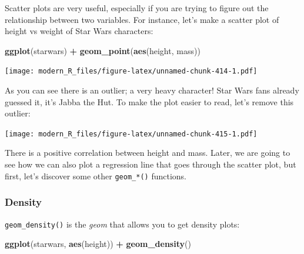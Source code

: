 \documentclass[]{gitbook}
\newenvironment{Shaded}{\begin{snugshade}}{\end{snugshade}}
\newcommand{\KeywordTok}[1]{\textcolor[rgb]{0.13,0.29,0.53}{\textbf{#1}}}
\newcommand{\NormalTok}[1]{#1}
\newcommand{\OperatorTok}[1]{\textcolor[rgb]{0.81,0.36,0.00}{\textbf{#1}}}
\newcommand{\StringTok}[1]{\textcolor[rgb]{0.31,0.60,0.02}{#1}}
\begin{document}
Scatter plots are very useful, especially if you are trying to figure out the relationship between two variables.
For instance, let's make a scatter plot of height vs weight of Star Wars characters:

\begin{Shaded}
\begin{Highlighting}[]
\KeywordTok{ggplot}\NormalTok{(starwars) }\OperatorTok{+}
\StringTok{  }\KeywordTok{geom_point}\NormalTok{(}\KeywordTok{aes}\NormalTok{(height, mass))}
\end{Highlighting}
\end{Shaded}

\texttt{[image: modern\_R\_files/figure-latex/unnamed-chunk-414-1.pdf]}

As you can see there is an outlier; a very heavy character! Star Wars fans already guessed it, it's Jabba the Hut.
To make the plot easier to read, let's remove this outlier:

\begin{Shaded}
\end{Shaded}

\texttt{[image: modern\_R\_files/figure-latex/unnamed-chunk-415-1.pdf]}

There is a positive correlation between height and mass. Later, we are going to see how we can also plot a regression
line that goes through the scatter plot, but first, let's discover some other \texttt{geom\_*()} functions.

\hypertarget{density}{%
\subsubsection{Density}\label{density}}

\texttt{geom\_density()} is the \emph{geom} that allows you to get density plots:

\begin{Shaded}
\begin{Highlighting}[]
\KeywordTok{ggplot}\NormalTok{(starwars, }\KeywordTok{aes}\NormalTok{(height)) }\OperatorTok{+}
\StringTok{  }\KeywordTok{geom_density}\NormalTok{()}
\end{Highlighting}
\end{Shaded}
\end{document}
